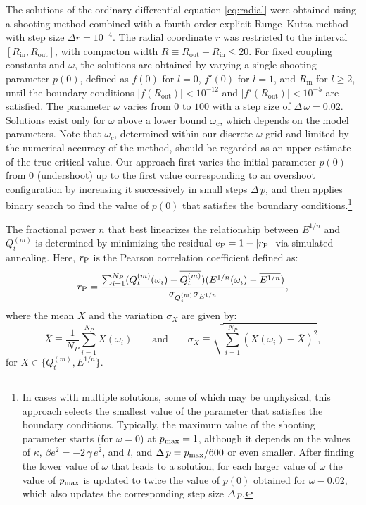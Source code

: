 \documentclass[aps,prd,superscriptaddress,notitlepage,11pt,final,longbibliography,nofootinbib]{revtex4-1}
\numberwithin{equation}{section}
\begin{document}
The solutions of the ordinary differential equation \eqref{eq:radial} were obtained using a shooting method combined with a fourth-order explicit Runge--Kutta method with step size $\Delta r = 10^{-4}$. The radial coordinate $r$ was restricted to the interval $[R_{\text{in}}, R_{\text{out}}]$, with compacton width $R \equiv R_{\text{out}} - R_{\text{in}} \leq 20$. For fixed coupling constants and $\omega$, the solutions are obtained by varying a single shooting parameter $p(0)$, defined as $f(0)$ for $l=0$, $f'(0)$ for $l=1$, and $R_{\text{in}}$ for $l \geq 2$, until the boundary conditions $\mid f(R_{\text{out}})\mid < 10^{-12}$  and $\mid f'(R_{\text{out}})\mid < 10^{-5}$ are satisfied. The parameter $\omega$ varies from $0$ to $100$ with a step size of $\Delta\,\omega=0.02$. Solutions exist only for $\omega$ above a lower bound $\omega_c$, which depends on the model parameters. Note that $\omega_c$, determined within our discrete $\omega$ grid and limited by the numerical accuracy of the method, should be regarded as an upper estimate of the true critical value. Our approach first varies the initial parameter $p(0)$ from $0$ (undershoot) up to the first value corresponding to an overshoot configuration by increasing it successively in small steps $\Delta \,p$, and then applies binary search to find the value of $p(0)$ that satisfies the boundary conditions.\footnote{In cases with multiple solutions, some of which may be unphysical, this approach selects the smallest value of the parameter that satisfies the boundary conditions. Typically, the maximum value of the shooting parameter starts (for $\omega=0$) at $p_{\rm max} = 1$, although it depends on the values of $\kappa$, $\beta e^2 = -2\,\gamma\,e^2$, and $l$, and $\Delta\,p = p_{\rm max}/600$ or even smaller. After finding the lower value of $\omega$ that leads to a solution, for each larger value of $\omega$ the value of $p_{\rm max}$ is updated to twice the value of $p(0)$ obtained for $\omega - 0.02$, which also updates the corresponding step size $\Delta\,p$.}

The fractional power $n$ that best linearizes the relationship between $E^{1/n}$ and $Q_t^{(m)}$ is determined by minimizing the residual $e_{\rm P} = 1 - |r_{\rm P}|$ via simulated annealing. Here, $r_{\rm P}$ is the Pearson correlation coefficient defined as:$$r_{\rm P} = \frac{\sum_{i=1}^{N_P} (Q_t^{(m)}(\omega_i) - \overline{Q_t^{(m)}})(E^{1/n}(\omega_i) - \overline{E^{1/n}})}{\sigma_{Q_t^{(m)}} \sigma_{E^{1/n}}},$$where the mean $\overline{X}$ and the variation $\sigma_X$ are given by:$$\overline{X} \equiv \frac{1}{N_P} \sum_{i=1}^{N_P} X(\omega_i) \qquad\text{and}\qquad \sigma_X \equiv \sqrt{\sum_{i=1}^{N_P} (X(\omega_i) - \overline{X})^2},$$ for $X \in \{Q_t^{(m)}, E^{1/n}\}$.
\end{document}
